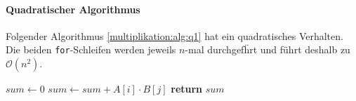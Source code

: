 \paragraph{Quadratischer Algorithmus}

Folgender Algorithmus \ref{multiplikation:alg:q1} hat ein quadratisches Verhalten.
Die beiden \texttt{for}-Schleifen werden jeweils $n$-mal durchgef\"hrt und f\"uhrt deshalb zu $\mathcal{O}\left(n^2\right)$.


\begin{algorithm}[H]\caption{}
	\label{multiplikation:alg:q1}
	\setlength{\lineskip}{7pt}
	\begin{algorithmic}
		\State $ sum \gets 0$
		\State $ sum \gets sum + A[i] \cdot B[j] $
		\EndFor
		\EndFor
		\State \textbf{return} $sum$
		\EndFunction
	\end{algorithmic}
\end{algorithm}


